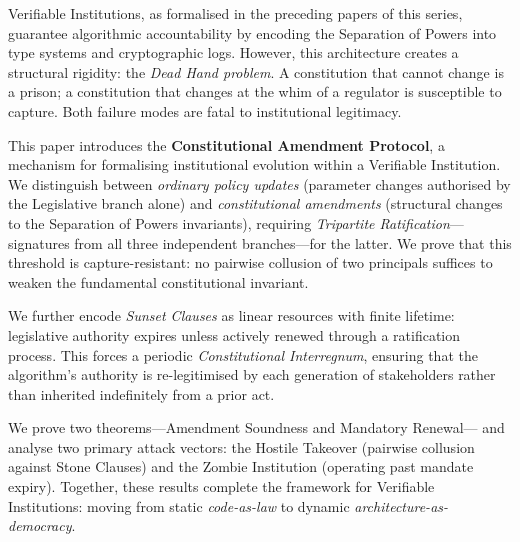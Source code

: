 Verifiable Institutions, as formalised in the preceding papers of this
series, guarantee algorithmic accountability by encoding the Separation
of Powers into type systems and cryptographic logs. However, this
architecture creates a structural rigidity: the \emph{Dead Hand
problem}. A constitution that cannot change is a prison; a constitution
that changes at the whim of a regulator is susceptible to capture.
Both failure modes are fatal to institutional legitimacy.

This paper introduces the \textbf{Constitutional Amendment Protocol},
a mechanism for formalising institutional evolution within a Verifiable
Institution. We distinguish between \emph{ordinary policy updates}
(parameter changes authorised by the Legislative branch alone) and
\emph{constitutional amendments} (structural changes to the
Separation of Powers invariants), requiring \emph{Tripartite
Ratification}---signatures from all three independent branches---for
the latter. We prove that this threshold is capture-resistant: no
pairwise collusion of two principals suffices to weaken the
fundamental constitutional invariant.

We further encode \emph{Sunset Clauses} as linear resources with
finite lifetime: legislative authority expires unless actively renewed
through a ratification process. This forces a periodic
\emph{Constitutional Interregnum}, ensuring that the algorithm's
authority is re-legitimised by each generation of stakeholders rather
than inherited indefinitely from a prior act.

We prove two theorems---Amendment Soundness and Mandatory Renewal---
and analyse two primary attack vectors: the Hostile Takeover (pairwise
collusion against Stone Clauses) and the Zombie Institution (operating
past mandate expiry). Together, these results complete the framework
for Verifiable Institutions: moving from static \emph{code-as-law}
to dynamic \emph{architecture-as-democracy}.
